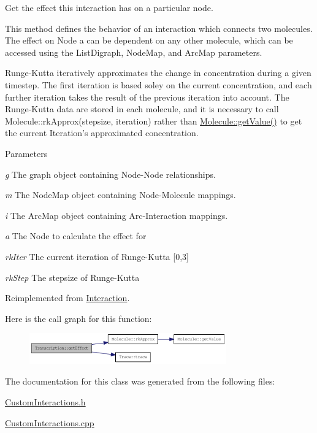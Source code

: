 Get the effect this interaction has on a particular node.

This method defines the behavior of an interaction which connects two molecules. The effect on Node a can be dependent on any other molecule, which can be accessed using the ListDigraph, NodeMap, and ArcMap parameters.

Runge-\/Kutta iteratively approximates the change in concentration during a given timestep. The first iteration is based soley on the current concentration, and each further iteration takes the result of the previous iteration into account. The Runge-\/Kutta data are stored in each molecule, and it is necessary to call Molecule::rkApprox(stepsize, iteration) rather than \hyperlink{classMolecule_a554ea822918374775d5f52b5d49d8195}{Molecule::getValue()} to get the current Iteration's approximated concentration.


\begin{DoxyParams}{Parameters}
\item[{\em g}]The graph object containing Node-\/Node relationships. \item[{\em m}]The NodeMap object containing Node-\/Molecule mappings. \item[{\em i}]The ArcMap object containing Arc-\/Interaction mappings. \item[{\em a}]The Node to calculate the effect for \item[{\em rkIter}]The current iteration of Runge-\/Kutta \mbox{[}0,3\mbox{]} \item[{\em rkStep}]The stepsize of Runge-\/Kutta \end{DoxyParams}


Reimplemented from \hyperlink{classInteraction_a6328831e714adf9c8177f6052d2e017f}{Interaction}.

Here is the call graph for this function:\nopagebreak
\begin{figure}[H]
\begin{center}
\leavevmode
\includegraphics[width=241pt]{classTranscription_a73f9e09dac4b601a297fd4d59c92cea5_cgraph}
\end{center}
\end{figure}


The documentation for this class was generated from the following files:\begin{DoxyCompactItemize}
\item 
\hyperlink{CustomInteractions_8h}{CustomInteractions.h}\item 
\hyperlink{CustomInteractions_8cpp}{CustomInteractions.cpp}\end{DoxyCompactItemize}

